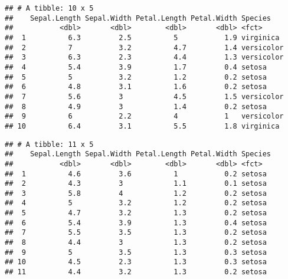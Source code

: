 \documentclass[]{book}
\newenvironment{Shaded}{\begin{snugshade}}{\end{snugshade}}
\newcommand{\DataTypeTok}[1]{\textcolor[rgb]{0.13,0.29,0.53}{#1}}
\newcommand{\DecValTok}[1]{\textcolor[rgb]{0.00,0.00,0.81}{#1}}
\newcommand{\KeywordTok}[1]{\textcolor[rgb]{0.13,0.29,0.53}{\textbf{#1}}}
\newcommand{\NormalTok}[1]{#1}
\newcommand{\OperatorTok}[1]{\textcolor[rgb]{0.81,0.36,0.00}{\textbf{#1}}}
\newcommand{\StringTok}[1]{\textcolor[rgb]{0.31,0.60,0.02}{#1}}
\begin{document}
\begin{Shaded}
\end{Shaded}

\begin{verbatim}
## # A tibble: 10 x 5
##    Sepal.Length Sepal.Width Petal.Length Petal.Width Species   
##           <dbl>       <dbl>        <dbl>       <dbl> <fct>     
##  1          6.3         2.5          5           1.9 virginica 
##  2          7           3.2          4.7         1.4 versicolor
##  3          6.3         2.3          4.4         1.3 versicolor
##  4          5.4         3.9          1.7         0.4 setosa    
##  5          5           3.2          1.2         0.2 setosa    
##  6          4.8         3.1          1.6         0.2 setosa    
##  7          5.6         3            4.5         1.5 versicolor
##  8          4.9         3            1.4         0.2 setosa    
##  9          6           2.2          4           1   versicolor
## 10          6.4         3.1          5.5         1.8 virginica
\end{verbatim}

\begin{Shaded}
\end{Shaded}

\begin{verbatim}
## # A tibble: 11 x 5
##    Sepal.Length Sepal.Width Petal.Length Petal.Width Species
##           <dbl>       <dbl>        <dbl>       <dbl> <fct>  
##  1          4.6         3.6          1           0.2 setosa 
##  2          4.3         3            1.1         0.1 setosa 
##  3          5.8         4            1.2         0.2 setosa 
##  4          5           3.2          1.2         0.2 setosa 
##  5          4.7         3.2          1.3         0.2 setosa 
##  6          5.4         3.9          1.3         0.4 setosa 
##  7          5.5         3.5          1.3         0.2 setosa 
##  8          4.4         3            1.3         0.2 setosa 
##  9          5           3.5          1.3         0.3 setosa 
## 10          4.5         2.3          1.3         0.3 setosa 
## 11          4.4         3.2          1.3         0.2 setosa
\end{verbatim}
\end{document}
